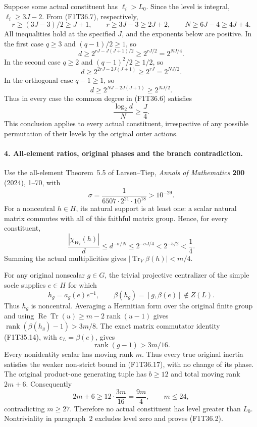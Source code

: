 Suppose some actual constituent has
\(\ell_i> L_0\). Since the level is integral,
\(\ell_i\ge3J-2\). From (F1T36.7),
respectively,
\[
 r\ge(3J-3)/2\ge J+1,\qquad
 r\ge3J-3\ge2J+2,\qquad
 N\ge6J-4\ge4J+4.
 \tag{F1T36.9}
\]
All inequalities hold at the specified
\(J\), and the exponents below are positive.
In the first case \(q\ge3\) and
\((q-1)/2\ge1\), so
\[
             d\ge2^{rJ-J(J+1)/2}
                  \ge2^{rJ/2}=2^{NJ/4}.
 \tag{F1T36.10}
\]
In the second case \(q\ge2\) and
\((q-1)^2/2\ge1/2\), so
\[
             d\ge2^{2rJ-2J(J+1)}
                  \ge2^{rJ}=2^{NJ/2}.
 \tag{F1T36.11}
\]
In the orthogonal case \(q-1\ge1\), so
\[
             d\ge2^{NJ-2J(J+1)}
                  \ge2^{NJ/2}.
 \tag{F1T36.12}
\]
Thus in every case the common degree in
(F1T36.6) satisfies
\[
                         \frac{\log_2 d}{N}\ge\frac J4.
 \tag{F1T36.13}
\]
This conclusion applies to every actual
constituent, irrespective of any possible
permutation of their levels by the original
outer actions.

\paragraph{4. All-element ratios, original phases and the branch contradiction.}
Use the all-element Theorem~5.5 of
Larsen--Tiep, \emph{Annals of Mathematics}
\textbf{200} (2024), 1--70, with
\[
 \sigma=\frac1{6507\cdot2^{21}\cdot10^{18}}
                              >10^{-29}.
 \tag{F1T36.14}
\]
For a noncentral \(h\in H\), its natural
support is at least one: a scalar natural
matrix commutes with all of this faithful
matrix group. Hence, for every constituent,
\[
 \frac{|\chi_{W_i}(h)|}{d}
       \le d^{-\sigma/N}
       \le2^{-\sigma J/4}
       <2^{-5/2}<\frac14.
 \tag{F1T36.15}
\]
Summing the actual multiplicities gives
\(\left|\operatorname{Tr}_V\beta(h)\right|<m/4\).

For any original nonscalar \(g\in G\), the
trivial projective centralizer of the simple
socle supplies \(e\in H\) for which
\[
 h_g=a_g(e)e^{-1},\qquad
 \beta(h_g)=[g,\beta(e)]\notin Z(L).
 \tag{F1T36.16}
\]
Thus \(h_g\) is noncentral. Averaging a
Hermitian form over the original finite group
and using
\(\operatorname{Re}\operatorname{Tr}(u)
\ge m-2\operatorname{rank}(u-1)\)
gives
\(\operatorname{rank}(\beta(h_g)-1)>3m/8\).
The exact matrix commutator identity
(F1T35.14), with \(e_L=\beta(e)\), gives
\[
                       \operatorname{rank}(g-1)>3m/16.
 \tag{F1T36.17}
\]
Every nonidentity scalar has moving rank
\(m\). Thus every true original inertia
satisfies the weaker non-strict bound in
(F1T36.17), with no change of its phase.
The original product-one generating tuple
has \(b\ge12\) and total moving rank
\(2m+6\). Consequently
\[
                    2m+6\ge12\cdot\frac{3m}{16}
                         =\frac{9m}{4},
                    \qquad m\le24,
 \tag{F1T36.18}
\]
contradicting \(m\ge27\). Therefore no
actual constituent has level greater than
\(L_0\). Nontriviality in paragraph~2
excludes level zero and proves (F1T36.2).

